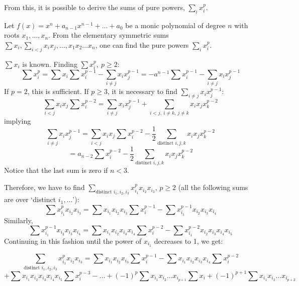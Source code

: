 From this, it is possible to derive the sums of pure powers, $\sum_{i} x_{i}^{p}$.
\begin{lemma}
\label{lem:pure}
Let $f(x) = x^{n} + a_{n-1}x^{n-1} + \ldots + a_{0}$ be a 
monic polynomial of degree $n$ with roots $x_{1}, \ldots, x_{n}$.
From the elementary symmetric sums $\sum x_{i}, \sum_{i < j} x_{i} x_{j}, \ldots,
x_{1}x_{2} \ldots x_{n}$, one can find the pure powers $\sum_{i} x_{i}^{p}$.
\end{lemma}
$\sum x_{i}$ is known.
Finding $\sum x_{i}^{p},\ p \geq 2$:
\begin{equation}
\label{eq1}
\sum x_{i}^{p} = \sum x_{i} \sum x_{i}^{p-1} - \sum_{i \neq j} x_{i} x_{j}^{p-1} 
	       = -a^{n-1}   \sum x_{i}^{p-1} - \sum_{i \neq j} x_{i} x_{j}^{p-1} 
\end{equation}
If $p=2$, this is sufficient.
If $p \geq 3$, it is necessary to find $\sum_{i \neq j} x_{i} x_{j}^{p-1}$:
\[ \sum_{i < j} x_{i} x_{j} \sum x_{i}^{p-2} = 
   \sum_{i \neq j} x_{i} x_{j}^{p-1} 
   + \sum_{i < j,\ i \neq k,\ j \neq k} x_{i} x_{j} x_{k}^{p-2}
\]
implying
\[
\sum_{i \neq j} x_{i} x_{j}^{p-1}  =  \sum_{i < j} x_{i} x_{j} \sum x_{i}^{p-2} 
	- \frac{1}{2} \sum_{\mbox{distinct }i,j,k} x_{i} x_{j} x_{k}^{p-2}
\]
\begin{equation}
\label{eq2}
 				   = a_{n-2} \sum x_{i}^{p-2} 
	- \frac{1}{2} \sum_{\mbox{distinct }i,j,k} x_{i} x_{j} x_{k}^{p-2}
\end{equation}
Notice that the last sum is zero if $n < 3$.

Therefore, we have to find
$\sum_{\mbox{distinct }i_{1},i_{2},i_{3}} x_{i_{1}}^{p} x_{i_{2}} x_{i_{3}}$,
$p \geq 2$
(all the following sums are over `distinct $i_{1}, \ldots$'):
\[ \sum x_{i_{1}}^{p} x_{i_{2}} x_{i_{3}} = 
   \sum x_{i_{1}} x_{i_{2}} x_{i_{3}} \sum x_{i}^{p-1}
   - \sum x_{i_{1}}^{p-1} x_{i_{2}} x_{i_{3}} x_{i_{4}}
\]
Similarly, 
\[ \sum x_{i_{1}}^{p-1} x_{i_{2}} x_{i_{3}} x_{i_{4}} = 
   \sum x_{i_{1}} x_{i_{2}} x_{i_{3}} x_{i_{4}} 	\sum x_{i}^{p-2}
   - \sum x_{i_{1}}^{p-2} x_{i_{2}} x_{i_{3}} x_{i_{4}} x_{i_{5}}
\]
Continuing in this fashion until the power of $x_{i_{1}}$ decreases to 1, we get:

\[ \sum_{\mbox{distinct }i_{1},i_{2},i_{3}} x_{i_{1}}^{p} x_{i_{2}} x_{i_{3}} = 
   \sum x_{i_{1}} x_{i_{2}} x_{i_{3}} \sum x_{i}^{p-1}
   - \sum x_{i_{1}} x_{i_{2}} x_{i_{3}} x_{i_{4}} 	\sum x_{i}^{p-2}
\]
\[ + \sum x_{i_{1}} x_{i_{2}} x_{i_{3}} x_{i_{4}} x_{i_{5}} \sum x_{i}^{p-3}
   - \ldots
   + (-1)^{p} \sum x_{i_{1}} x_{i_{2}} \ldots x_{i_{p+1}} \sum x_{i}
   + (-1)^{p+1} \sum x_{i_{1}} x_{i_{2}} \ldots x_{i_{p+2}}
\]

